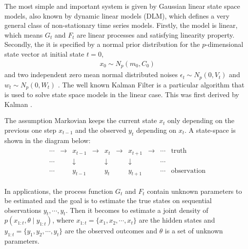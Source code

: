 The most simple and important system is given by Gaussian linear state space models, also known by dynamic linear models (DLM), which defines a very general class of non-stationary time series models.  Firstly, the model is linear, which means $G_t$ and $F_t$ are linear processes and satisfying linearity property. Secondly, the it is specified by a normal prior distribution for the $p$-dimensional state vector at initial state $t=0$, 
\begin{align*}
x_0 \sim N_p(m_0,C_0)
\end{align*} 
and two independent zero mean normal distributed noises $\epsilon_t \sim N_p(0,V_t)$ and $w_t \sim N_p(0,W_t)$ \cite{petris2009dynamic}. The well known Kalman Filter is a particular algorithm that is used to solve state space models in the linear case. This was first derived by Kalman \cite{kalman1960new}.

The assumption Markovian keeps the current state $x_t$ only depending on the previous one step $x_{t-1}$ and the observed $y_t$ depending on $x_t$. A state-space is shown in the diagram below:
\begin{align*}
{\displaystyle {\begin{array}{cccccccccc}\cdots &\to &x_{t-1}&\to &x_{t}&\to &x_{t+1}&\to &\cdots &{\text{truth}}\\ \cdots &&\downarrow &&\downarrow &&\downarrow &&\cdots &\\ \cdots&&y_{t-1}&&y_{t}&&y_{t+1}&&\cdots &{\text{observation}}\end{array}}}
\end{align*}

In applications, the process function $G_t$ and $F_t$ contain unknown parameters to be estimated \cite{de1988likelihood} and the goal is to estimate the true states on sequential observations $y_t, \cdots, y_t$. Then it becomes to estimate a joint density of $p(x_{1:t},\theta \mid y_{1:t})$, where $x_{1:t} = \{x_1, x_2, \cdots, x_t \}$ are the hidden states and $y_{1:t} = \{y_1, y_2, \cdots, y_t \}$ are the observed outcomes and $\theta$ is a set of unknown parameters. 


